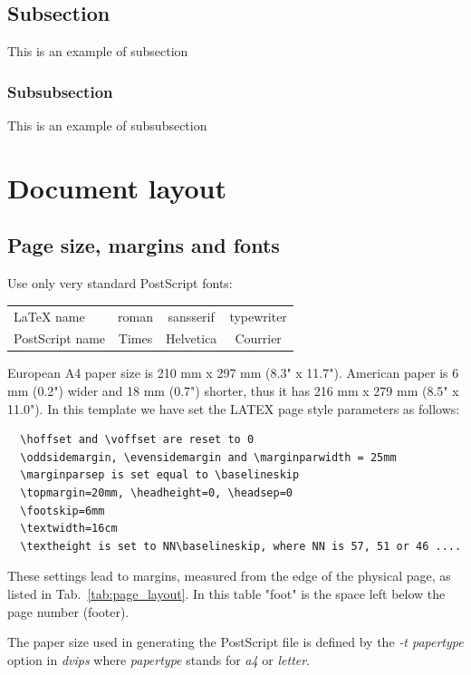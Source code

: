 \documentclass{cmspaper}
\begin{document}
\subsection{Subsection}

This is an example of subsection

\subsubsection{Subsubsection}

This is an example of subsubsection

\section{Document layout}

\subsection{Page size, margins and fonts}

Use only very standard PostScript fonts: 
      \begin{tabular}{|l|ccc|} \hline
         LaTeX name & roman & sansserif & typewriter \\
         PostScript name & Times & Helvetica & Courrier \\ \hline
      \end{tabular}

  European A4 paper size is 210 mm x 297 mm (8.3" x 11.7").
  American paper is 6 mm (0.2") wider and 18 mm (0.7") shorter, 
  thus it has 216 mm x 279 mm (8.5" x 11.0").
  In this template we have set the LATEX page style parameters as follows:
{\small \begin{verbatim}
  \hoffset and \voffset are reset to 0
  \oddsidemargin, \evensidemargin and \marginparwidth = 25mm
  \marginparsep is set equal to \baselineskip
  \topmargin=20mm, \headheight=0, \headsep=0
  \footskip=6mm
  \textwidth=16cm
  \textheight is set to NN\baselineskip, where NN is 57, 51 or 46 ....
\end{verbatim} }

  These settings lead to margins, measured from the edge of the physical page, 
  as listed in Tab.~\ref{tab:page_layout}.
  In this table "foot" is the space left below the page number (footer).

  The paper size used in generating the PostScript file is defined by 
  the {\em -t papertype} option in {\em dvips} 
  where {\em papertype} stands for {\em a4} or {\em letter}.
\end{document}
